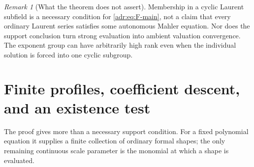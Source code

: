 \documentclass[11pt,letterpaper]{article}
\numberwithin{equation}{section}
\theoremstyle{definition}
\theoremstyle{remark}
\newtheorem{remark}[remark]{Remark}
\begin{document}
\begin{remark}[What the theorem does not assert]
Membership in a cyclic Laurent subfield is a necessary condition for
\eqref{adr:eq:F-main}, not a claim that every ordinary Laurent series satisfies
some autonomous Mahler equation. Nor does the support conclusion turn
strong evaluation into ambient valuation convergence. The exponent group
can have arbitrarily high rank even when the individual solution is
forced into one cyclic subgroup.
\end{remark}

\section{Finite profiles, coefficient descent, and an existence test}
\label{adr:sec:profiles}

The proof gives more than a necessary support condition. For a fixed
polynomial equation it supplies a finite collection of ordinary formal
shapes; the only remaining continuous scale parameter is the monomial
at which a shape is evaluated.
\end{document}
